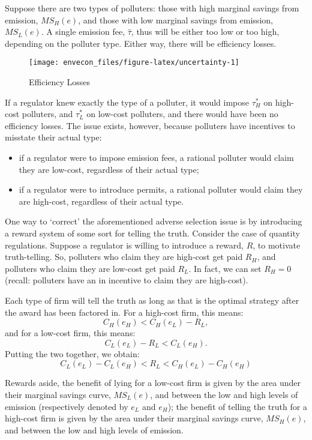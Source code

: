 \documentclass[
]{book}
\providecommand{\tightlist}{%
  \setlength{\itemsep}{0pt}\setlength{\parskip}{0pt}}
\begin{document}
Suppose there are two types of polluters: those with high marginal savings from emission, \(MS_H(e)\), and those with low marginal savings from emission, \(MS_L(e)\). A single emission fee, \(\hat{\tau}\), thus will be either too low or too high, depending on the polluter type. Either way, there will be efficiency losses.

\begin{figure}

{\centering \texttt{[image: envecon\_files/figure-latex/uncertainty-1]} 

}

\caption{Efficiency Losses}\label{fig:uncertainty}
\end{figure}

If a regulator knew exactly the type of a polluter, it would impose \(\tau_H^*\) on high-cost polluters, and \(\tau_L^*\) on low-cost polluters, and there would have been no efficiency losses. The issue exists, however, because polluters have incentives to misstate their actual type:

\begin{itemize}
\tightlist
\item
  if a regulator were to impose emission fees, a rational polluter would claim they are low-cost, regardless of their actual type;
\item
  if a regulator were to introduce permits, a rational polluter would claim they are high-cost, regardless of their actual type.
\end{itemize}

One way to `correct' the aforementioned adverse selection issue is by introducing a reward system of some sort for telling the truth. Consider the case of quantity regulations. Suppose a regulator is willing to introduce a reward, \(R\), to motivate truth-telling. So, polluters who claim they are high-cost get paid \(R_H\), and polluters who claim they are low-cost get paid \(R_L\). In fact, we can set \(R_H=0\) (recall: polluters have an in incentive to claim they are high-cost).

Each type of firm will tell the truth as long as that is the optimal strategy after the award has been factored in. For a high-cost firm, this means: \[C_H(e_H) < C_H(e_L)-R_L,\] and for a low-cost firm, this means: \[C_L(e_L)-R_L < C_L(e_H).\] Putting the two together, we obtain: \[C_L(e_L) - C_L(e_H) < R_L < C_H(e_L) - C_H(e_H)\]

Rewards aside, the benefit of lying for a low-cost firm is given by the area under their marginal savings curve, \(MS_L(e)\), and between the low and high levels of emission (respectively denoted by \(e_L\) and \(e_H\)); the benefit of telling the truth for a high-cost firm is given by the area under their marginal savings curve, \(MS_H(e)\), and between the low and high levels of emission.
\end{document}
